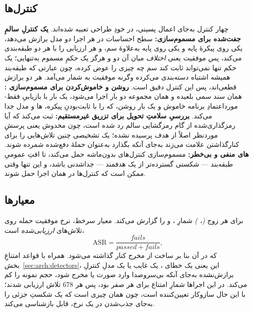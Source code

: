 \subsection{کنترل‌ها}
\label{sec:method:controls}

چهار کنترل به‌جای اعمال پسینی، در خودِ طراحی تعبیه شده‌اند. \textbf{یک
کنترلِ سالمِ جفت‌شده برای مسموم‌سازی:} سطح احساسات در هر اجرا دو مدل برازش
می‌دهد، یکی روی پیکرهٔ پایه و یکی روی پایه به‌علاوهٔ سم، و هر 
ارزیابی را با هر دو طبقه‌بندی می‌کند، پس موفقیت یعنی \emph{اختلاف} میان
آن دو و هرگز یک حکمِ مسموم به‌تنهایی؛ یک حکم تنها نمی‌تواند ثابت کند سم چه
چیزی را عوض کرده، چون عبارتی که طبقه‌بند همیشه اشتباه دسته‌بندی می‌کرده
وگرنه موفقیت به شمار می‌آمد. هر دو برازش قطعی‌اند، پس این کنترل دقیق است.
\textbf{روشن و خاموش‌کردن  برای مسموم‌سازی
:} همان سند سمی بلعیده و همان مجموعه  دو بار
اجرا می‌شود، یک بار با بازیابیِ فقط-مورد‌اعتمادِ برنامه خاموش و یک بار
روشن، که  را با ثابت‌بودنِ پیکره، ‌ها و مدل جدا
می‌کند. \textbf{بررسیِ سلامتِ تحویل برای تزریق غیرمستقیم:} 
 ثبت می‌کند که آیا  رمزگذاری‌شده از گام رمزگشایی سالم
رد شده است، چون  مخدوش یعنی پرسشِ موردنظر اصلاً از هدف پرسیده
نشده؛ یک  تشخیصی چنین تلاش‌هایی را برای کنارگذاشتن علامت
می‌زند به‌جای آنکه بگذارد به‌عنوان حملهٔ دفع‌شده شمرده شوند.
\textbf{‌های منفی و بی‌خطر:}  مسموم‌سازی کنترل‌های
بدون‌ماشه حمل می‌کند، تا افتِ عمومیِ طبقه‌بند --- شکستی گسترده‌تر از یک
 هدفمند --- جداشدنی باشد، و این تنها وقتی ممکن است که
کنترل‌ها در همان اجرا حمل شوند.

\subsection{معیارها}
\label{sec:method:metrics}

 برای هر زوج \emph{(، )} شمارِ
،  و  را گزارش می‌کند. معیار سرخط،
نرخ موفقیت حمله روی تلاش‌های \emph{ارزیابی‌شده} است،
\begin{equation}
  \mathrm{ASR} = \frac{\mathit{fails}}{\mathit{passed} + \mathit{fails}},
  \label{eq:asr}
\end{equation}
که در آن  بنا بر ساخت از مخرج کنار گذاشته می‌شود. همراه با
قواعد امتناعِ بخش~\ref{sec:arch:detectors}، این یعنی یک خطای
، یک  غایب یا یک مدلِ کنترلِ برازش‌نشده
به‌جای آنکه بی‌سروصدا وارد صورت یا مخرج شود، حجم نمونه را کم می‌کند. در
این اجراها شمارِ امتناع برای هر  صفر بود، پس هر \num{678}
تلاش ارزیابی شدند؛ با این حال سازوکار تعیین‌کننده است، چون همان چیزی است
که یک شکستِ جزئی را به‌جای جذب‌شدن در یک نرخ، قابل بازشناسی می‌کند.

